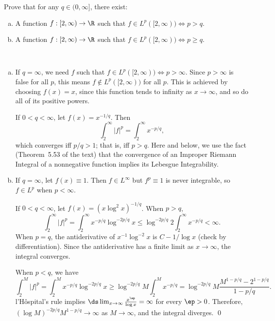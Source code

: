 \begin{hwsol}
Prove that for any $q \in (0, \infty]$, there exist:  
        \begin{enumerate}[(a)]
        \item A function $f: [2, \infty) \to \R$ such that $f \in L^p([2, \infty)) \iff p > q$.
        \item A function $f: [2, \infty) \to \R$ such that $f \in L^p([2, \infty)) \iff p \geq q$. \\
        \end{enumerate}
 \\

\pf \hfill
\begin{enumerate}[(a)]
\item If $q= \infty$, we need $f$ such that $f \in L^p([2, \infty)) \iff p > \infty$. Since $p > \infty$ is false for all $p$, this means $f \notin L^p([2, \infty))$ for all $p$. This is achieved by choosing $f(x)= x$, since this function tends to infinity as $x \to \infty$, and so do all of its positive powers. 

If $0< q < \infty$, let $f(x)= x^{-1/q}$. Then 
        \[
        \int_2^\infty |f|^p= \int_2^\infty x^{-p/q},
        \]
which converges iff $p/q >1$; that is, iff $p > q$. Here and below, we use the fact (Theorem~5.53 of the text) that the convergence of an Improper Riemann Integral of a nonnegative function implies its Lebesgue Integrability. 

\item If $q= \infty$, let $f(x) \equiv 1$. Then $f \in L^\infty$ but $f^p \equiv 1$ is never integrable, so $f \in L^p$ when $p < \infty$.  

If $0< q < \infty$, let $f(x)= (x\log^2 x)^{-1/q}$. When $p > q$, 
        \[
        \int_2^\infty |f|^p= \int_2^\infty x^{-p/q} \log^{-2p/q} x \leq \log^{-2p/q} 2 \int_2^\infty x^{-p/q} < \infty.
        \]
When $p= q$, the antiderivative of $x^{-1} \log^{-2} x$ is $C-1/\log x$ (check by differentiation). Since the antiderivative has a finite limit as $x \to \infty$, the integral converges.  

When $p< q$, we have 
        \[
        \int_2^M |f|^p= \int_2^M x^{-p/q} \log^{-2p/q} x \geq \log^{-2p/q} M \int_2^M x^{-p/q}= \log^{-2p/q} M \frac{M^{1-p/q} - 2^{1-p/q}}{1-p/q}.
        \]
l'H\^ospital's rule implies $\ds\lim_{x \to \infty} \frac{x^\ep}{\log x}= \infty$ for every $\ep > 0$. Therefore,  $(\log M)^{-2p/q} M^{1-p/q} \to \infty$ as $M \to \infty$, and the integral diverges. \qed \\
\end{enumerate}


\end{hwsol}
